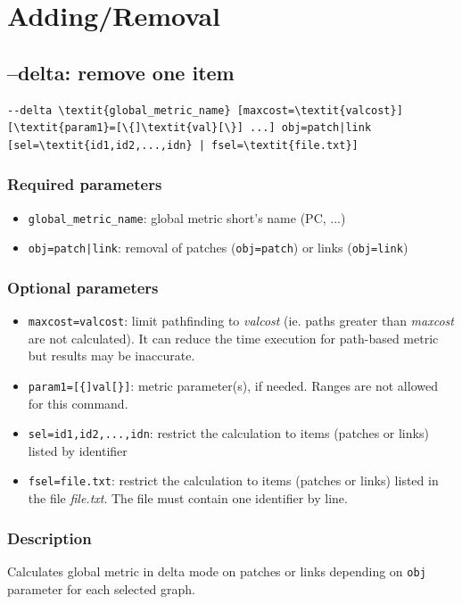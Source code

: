 \documentclass[a4paper,10pt]{report}
\begin{document}
\section{Adding/Removal}
\subsection{--delta: remove one item}
\begin{Verbatim}[commandchars=\\\{\}]
--delta \textit{global_metric_name} [maxcost=\textit{valcost}] [\textit{param1}=[\{]\textit{val}[\}] ...] obj=patch|link
[sel=\textit{id1,id2,...,idn} | fsel=\textit{file.txt}]
\end{Verbatim}

\subsubsection{Required parameters}
\begin{itemize}
	\item \verb|global_metric_name|: global metric short's name (PC, ...)
	\item \verb+obj=patch|link+: removal of patches (\verb+obj=patch+) or links (\verb+obj=link+)
\end{itemize}

\subsubsection{Optional parameters}
\begin{itemize}
	\item \verb|maxcost=valcost|: limit pathfinding to \textit{valcost} (ie. paths greater than \textit{maxcost} are not calculated). It can reduce the time execution for path-based metric but results may be inaccurate.
	\item \verb|param1=[{]val[}]|: metric parameter(s), if needed. Ranges are not allowed for this command.
	\item \verb|sel=id1,id2,...,idn|: restrict the calculation to items (patches or links) listed by identifier
	\item \verb|fsel=file.txt|: restrict the calculation to items (patches or links) listed in the file \textit{file.txt}. The file must contain one identifier by line.
\end{itemize}

\subsubsection{Description}
Calculates global metric in delta mode on patches or links depending on \verb|obj| parameter for each selected graph. 
\end{document}
